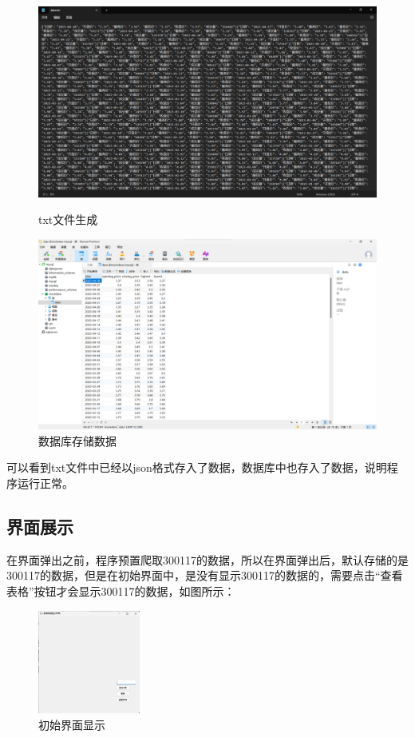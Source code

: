 \documentclass[UTF8,12pt]{article}
\begin{document}
\begin{figure}[htbp]
	\begin{minipage}{0.49\linewidth}
		\centering
		\includegraphics[width=0.9\linewidth]{img/11.png}
		\caption{txt文件生成}
		\label{3}%
	\end{minipage}
	\begin{minipage}{0.49\linewidth}
		\centering
		\includegraphics[width=0.9\linewidth]{img/12.png}
		\caption{数据库存储数据}
		\label{4}%
	\end{minipage}
\end{figure}

可以看到txt文件中已经以json格式存入了数据，数据库中也存入了数据，说明程序运行正常。

\subsection{界面展示}
在界面弹出之前，程序预置爬取300117的数据，所以在界面弹出后，默认存储的是300117的数据，但是在初始界面中，是没有显示300117的数据的，需要点击“查看表格”按钮才会显示300117的数据，如图所示：

\begin{figure}[htbp]
    \centering
    \includegraphics[width=0.3\textwidth]{img/13.png}
    \caption{初始界面显示}
\end{figure}
\end{document}
